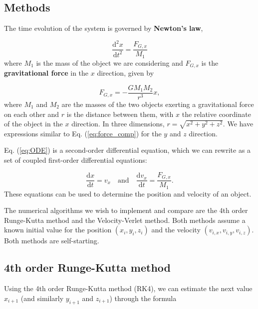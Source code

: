 \documentclass{article}
\begin{document}
\begin{multicols}{2}
\section{Methods}\label{sec:methods}

The time evolution of the system is governed by \textbf{Newton's law},

\begin{equation}\label{eq:ODE}
	\frac{\mathrm{d}^2 x}{\mathrm{d}t^2} = \frac{F_{G,x}}{M_1}
\end{equation}
where $M_1$ is the mass of the object we are considering and $F_{G,x}$ is the \textbf{gravitational force} in the $x$ direction, given by 

\begin{equation}\label{eq:force_comp}
	F_{G,x} = - \frac{G M_1 M_2}{r^3}x,
\end{equation}
where $M_1$ and $M_2$ are the masses of the two objects exerting a gravitational force on each other and $r$ is the distance between them, with $x$ the relative coordinate of the object in the $x$ direction. In three dimensions, $r = \sqrt{x^2 + y^2 + z^2}$. We have expressions similar to Eq. (\ref{eq:force_comp}) for the $y$ and $z$ direction.

Eq. (\ref{eq:ODE}) is a second-order differential equation, which we can rewrite as a set of coupled first-order differential equations:

\begin{equation}
	\frac{\mathrm{d}x}{\mathrm{d}t} = v_x  \quad \mathrm{and} \quad \frac{\mathrm{d}v_x}{\mathrm{d}t} = \frac{F_{G,x}}{M_1}.
\end{equation}
These equations can be used to determine the position and velocity of an object.


The numerical algorithms we wish to implement and compare are the 4th order Runge-Kutta method and the Velocity-Verlet method. Both methods assume a known initial value for the position $(x_i,y_i,z_i)$ and the velocity $(v_{i,x},v_{i,y},v_{i,z})$. Both methods are self-starting. 


\subsection{4th order Runge-Kutta method}\label{sec:RK4}
Using the 4th order Runge-Kutta method (RK4), we can estimate the next value $x_{i+1}$ (and similarly $y_{i+1}$ and $z_{i+1}$) through the formula


\end{multicols}
\end{document}
